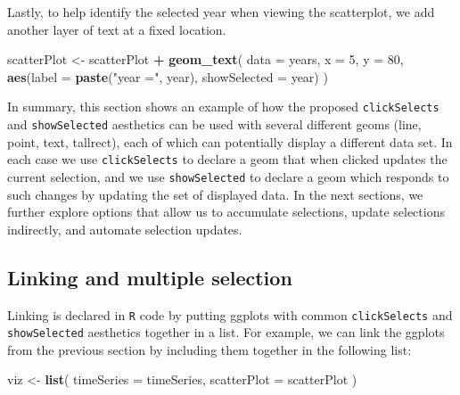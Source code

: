 \documentclass[12pt,]{article}
\newenvironment{Shaded}{\begin{snugshade}}{\end{snugshade}}
\newcommand{\DataTypeTok}[1]{\textcolor[rgb]{0.13,0.29,0.53}{#1}}
\newcommand{\DecValTok}[1]{\textcolor[rgb]{0.00,0.00,0.81}{#1}}
\newcommand{\KeywordTok}[1]{\textcolor[rgb]{0.13,0.29,0.53}{\textbf{#1}}}
\newcommand{\NormalTok}[1]{#1}
\newcommand{\OperatorTok}[1]{\textcolor[rgb]{0.81,0.36,0.00}{\textbf{#1}}}
\newcommand{\StringTok}[1]{\textcolor[rgb]{0.31,0.60,0.02}{#1}}
\theoremstyle{definition}
\theoremstyle{definition}
\theoremstyle{definition}
\theoremstyle{remark}
\begin{document}
Lastly, to help identify the selected year when viewing the scatterplot,
we add another layer of text at a fixed location.

\begin{Shaded}
\begin{Highlighting}[]
\NormalTok{scatterPlot <-}\StringTok{ }\NormalTok{scatterPlot }\OperatorTok{+}\StringTok{ }\KeywordTok{geom_text}\NormalTok{(}
  \DataTypeTok{data =}\NormalTok{ years, }\DataTypeTok{x =} \DecValTok{5}\NormalTok{, }\DataTypeTok{y =} \DecValTok{80}\NormalTok{,}
  \KeywordTok{aes}\NormalTok{(}\DataTypeTok{label =} \KeywordTok{paste}\NormalTok{(}\StringTok{"year ="}\NormalTok{, year),}
      \DataTypeTok{showSelected =}\NormalTok{ year)}
\NormalTok{)}
\end{Highlighting}
\end{Shaded}

In summary, this section shows an example of how the proposed
\texttt{clickSelects} and \texttt{showSelected} aesthetics can be used
with several different geoms (line, point, text, tallrect), each of
which can potentially display a different data set. In each case we use
\texttt{clickSelects} to declare a geom that when clicked updates the
current selection, and we use \texttt{showSelected} to declare a geom
which responds to such changes by updating the set of displayed data. In
the next sections, we further explore options that allow us to
accumulate selections, update selections indirectly, and automate
selection updates.

\hypertarget{linking}{%
\subsection{Linking and multiple selection}\label{linking}}

Linking is declared in \texttt{R} code by putting ggplots with common
\texttt{clickSelects} and \texttt{showSelected} aesthetics together in a
list. For example, we can link the ggplots from the previous section by
including them together in the following list:

\begin{Shaded}
\begin{Highlighting}[]
\NormalTok{viz <-}\StringTok{ }\KeywordTok{list}\NormalTok{(}
  \DataTypeTok{timeSeries =}\NormalTok{ timeSeries,}
  \DataTypeTok{scatterPlot =}\NormalTok{ scatterPlot}
\NormalTok{)}
\end{Highlighting}
\end{Shaded}
\end{document}
